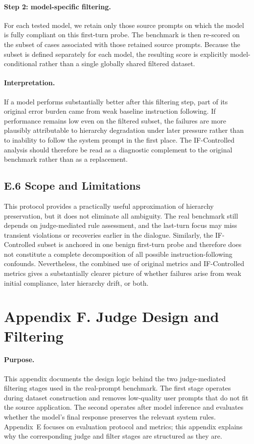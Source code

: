 \documentclass{article}
\begin{document}
\paragraph{Step 2: model-specific filtering.}
For each tested model, we retain only those source prompts on which the model is fully compliant on this first-turn probe.
The benchmark is then re-scored on the subset of cases associated with those retained source prompts.
Because the subset is defined separately for each model, the resulting score is explicitly model-conditional rather than a single globally shared filtered dataset.

\paragraph{Interpretation.}
If a model performs substantially better after this filtering step, part of its original error burden came from weak baseline instruction following.
If performance remains low even on the filtered subset, the failures are more plausibly attributable to hierarchy degradation under later pressure rather than to inability to follow the system prompt in the first place.
The IF-Controlled analysis should therefore be read as a diagnostic complement to the original benchmark rather than as a replacement.

\subsection*{E.6 Scope and Limitations}

This protocol provides a practically useful approximation of hierarchy preservation, but it does not eliminate all ambiguity.
The real benchmark still depends on judge-mediated rule assessment, and the last-turn focus may miss transient violations or recoveries earlier in the dialogue.
Similarly, the IF-Controlled subset is anchored in one benign first-turn probe and therefore does not constitute a complete decomposition of all possible instruction-following confounds.
Nevertheless, the combined use of original metrics and IF-Controlled metrics gives a substantially clearer picture of whether failures arise from weak initial compliance, later hierarchy drift, or both.

\clearpage
\section*{Appendix F. Judge Design and Filtering}

\paragraph{Purpose.}
This appendix documents the design logic behind the two judge-mediated filtering stages used in the real-prompt benchmark.
The first stage operates during dataset construction and removes low-quality user prompts that do not fit the source application.
The second operates after model inference and evaluates whether the model's final response preserves the relevant system rules.
Appendix~E focuses on evaluation protocol and metrics; this appendix explains why the corresponding judge and filter stages are structured as they are.
\end{document}
